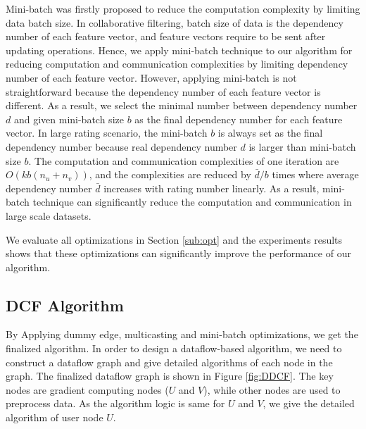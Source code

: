 \documentclass{llncs}
\begin{document}
Mini-batch \cite{Dean2012} was firstly proposed to reduce the computation complexity by limiting data batch size. In collaborative filtering, batch size of data is the dependency number of each feature vector, and feature vectors require to be sent after updating operations. Hence, we apply mini-batch technique to our algorithm for reducing computation and communication complexities by limiting dependency number of each feature vector. However, applying mini-batch is not straightforward because the dependency number of each feature vector is different. As a result, we select the minimal number between dependency number $d$ and given mini-batch size $b$ as the final dependency number for each feature vector. In large rating scenario, the mini-batch $b$ is always set as the final dependency number because real dependency number $d$ is larger than mini-batch size $b$. The computation and communication complexities of one iteration are $O(kb(n_u + n_v))$, and the complexities are reduced by $\bar{d}/b$ times where average dependency number $\bar{d}$ increases with rating number linearly. As a result, mini-batch technique can significantly reduce the computation and communication in large scale datasets.

We evaluate all optimizations in Section \ref{sub:opt} and the experiments results shows that these optimizations can significantly improve the performance of our algorithm.

\vspace{-15pt}
\subsection{DCF Algorithm}
\vspace{-5pt}
By Applying dummy edge, multicasting and mini-batch optimizations, we get the finalized algorithm. In order to design a dataflow-based algorithm, we need to construct a dataflow graph and give detailed algorithms of each node in the graph. The finalized dataflow graph is shown in Figure \ref{fig:DDCF}. The key nodes are gradient computing nodes ($U$ and $V$), while other nodes are used to preprocess data. As the algorithm logic is same for $U$ and $V$, we give the detailed algorithm of user node $U$.
\end{document}
